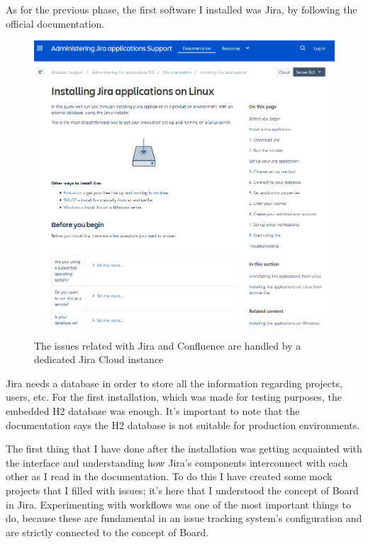	As for the previous phase, the first software I installed was Jira, by following the official documentation.
	\begin{figure}[H]
		\centering
		\includegraphics[width=1\textwidth]{resources/jira_installation}\\
		\caption{The issues related with Jira and Confluence are handled by a dedicated Jira Cloud instance}
	\end{figure}
	Jira needs a database in order to store all the information regarding projects, users, etc.
	For the first installation, which was made for testing purposes, the embedded H2 database was enough.
	It's important to note that the documentation says the H2 database is not suitable for production environments.
	
	
	The first thing that I have done after the installation was getting acquainted with the interface and understanding how Jira's components interconnect with each other as I read in the documentation.
	To do this I have created some mock projects that I filled with issues; it's here that I understood the concept of Board in Jira.
	Experimenting with workflows was one of the most important things to do, because these are fundamental in an issue tracking system's configuration and are strictly connected to the concept of Board.
	
